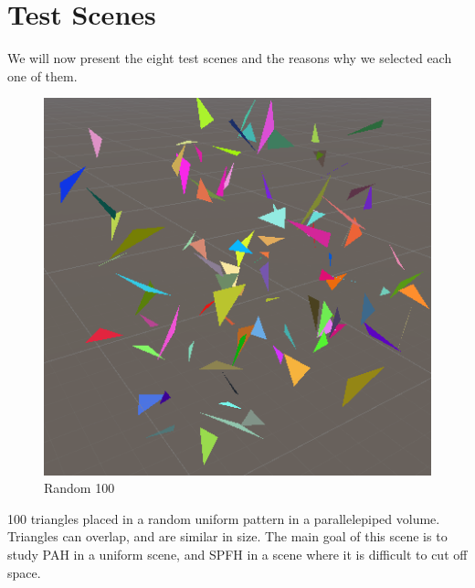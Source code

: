 \documentclass{PoliMi_MasterThesis}
\begin{document}
\section{Test Scenes} \label{sec:test_scenes}
We will now present the eight test scenes and the reasons why we selected each one of them.
\begin{minipage}{0.4\textwidth}
	\begin{figure}[H]
		\includegraphics[width=\textwidth]{Images/random100_scene.png}
		\caption{Random 100}
		\label{fig:random_100}
	\end{figure}
\end{minipage} \hfill
\begin{minipage}{0.55\textwidth}
	100 triangles placed in a random uniform pattern in a parallelepiped volume. Triangles can overlap, and are similar in size. The main goal of this scene is to study PAH in a uniform scene, and SPFH in a scene where it is difficult to cut off space.\\
\end{minipage}
\end{document}
